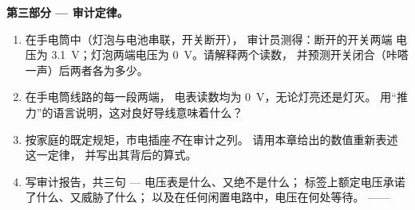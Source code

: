 \begin{problem}
\medskip\noindent\textbf{第三部分 --- 审计定律。}
\begin{enumerate}[resume]
  \item 在手电筒中（灯泡与电池串联，开关断开），
        审计员测得：断开的开关两端
        电压为 \qty{3.1}{V}；灯泡两端电压为 \qty{0}{V}。请解释两个读数，
        并预测开关闭合（咔嗒一声）后两者各为多少。
  \item 在手电筒线路的每一段两端，
        电表读数均为 \qty{0}{V}，无论灯亮还是灯灭。
        用“推力”的语言说明，这对良好导线意味着什么？
  \item 按家庭的既定规矩，市电插座\emph{不}在审计之列。
        请用本章给出的数值重新表述这一定律，
        并写出其背后的算式。
  \item 写审计报告，共三句 --- 电压表是什么、又绝不是什么；
        标签上额定电压承诺了什么、又威胁了什么；
        以及在任何闲置电路中，电压在何处等待。
        ——
\end{enumerate}
\end{problem}
